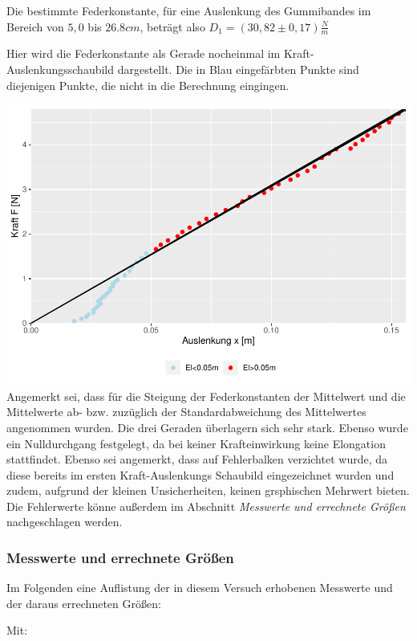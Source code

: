 \documentclass[
  9pt,
]{article}
\begin{document}
Die bestimmte Federkonstante, für eine Auslenkung des Gummibandes im
Bereich von \(5,0\) bis \(26.8cm\), beträgt also
\(D_1=(30,82\pm 0,17)\frac{N}{m}\)

\newpage

Hier wird die Federkonstante als Gerade nocheinmal im
Kraft-Auslenkungsschaubild dargestellt. Die in Blau eingefärbten Punkte
sind diejenigen Punkte, die nicht in die Berechnung eingingen.

\includegraphics{DehnbareStoffe_files/figure-latex/unnamed-chunk-11-1.pdf}
Angemerkt sei, dass für die Steigung der Federkonstanten der Mittelwert
und die Mittelwerte ab- bzw. zuzüglich der Standardabweichung des
Mittelwertes angenommen wurden. Die drei Geraden überlagern sich sehr
stark. Ebenso wurde ein Nulldurchgang festgelegt, da bei keiner
Krafteinwirkung keine Elongation stattfindet. Ebenso sei angemerkt, dass
auf Fehlerbalken verzichtet wurde, da diese bereits im ersten
Kraft-Auslenkungs Schaubild eingezeichnet wurden und zudem, aufgrund der
kleinen Unsicherheiten, keinen grsphischen Mehrwert bieten. Die
Fehlerwerte könne außerdem im Abschnitt
\textit{Messwerte und errechnete Größen} nachgeschlagen werden.

\hypertarget{messwerte-und-errechnete-gruxf6uxdfen}{%
\subsubsection{Messwerte und errechnete
Größen}\label{messwerte-und-errechnete-gruxf6uxdfen}}

Im Folgenden eine Auflistung der in diesem Versuch erhobenen Messwerte
und der daraus errechneten Größen:

Mit:
\end{document}

